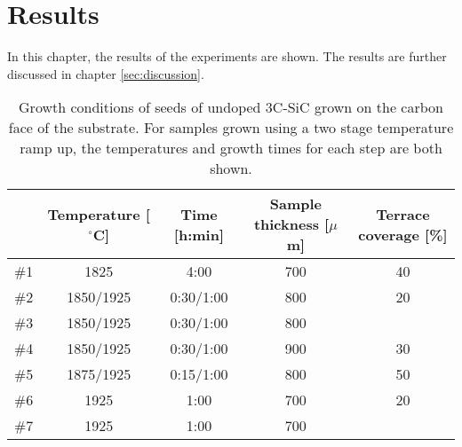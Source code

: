 

	
	

	
	

\chapter{Results}
In this chapter, the results of the experiments are shown. The results are further discussed in chapter \ref{sec:discussion}. 

\begin{table}[h]
\caption{Growth conditions of seeds of undoped 3C-SiC grown on the carbon face of the substrate. For samples grown using a two stage temperature ramp up, the temperatures and growth times for each step are both shown.}
\label{tab:seeds}
\begin{center}
\begin{tabular}{l c c c c}
  \hline                       
  \hline       
  \vspace{1mm}
   & \small{Temperature [$^\circ$C]} & \small{Time [h:min]} & \small{Sample thickness [$\mu$m]} & \small{Terrace coverage [\%]}\\
    \hline
  \#1 & 1825 & 4:00 & 700 & 40\\
  \#2 & 1850/1925 & 0:30/1:00 & 800 & 20\\
  \#3 & 1850/1925 & 0:30/1:00 & 800 & \\
  \#4 & 1850/1925 & 0:30/1:00 & 900 & 30\\
  \#5 & 1875/1925 & 0:15/1:00 & 800 & 50\\
  \#6 & 1925 & 1:00 & 700 & 20\\
  \#7 & 1925 & 1:00 & 700 & \\
  \hline  
\end{tabular}
\end{center}
\end{table}

